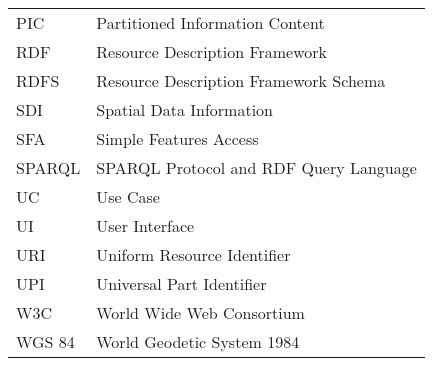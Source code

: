 \begin{longtable}{lp{11cm}}
  
  PIC & Partitioned Information Content   \\
  
  
  RDF &  Resource Description Framework\\
  RDFS & Resource Description Framework Schema\\
  SDI  & Spatial Data Information\\
  SFA & Simple Features Access \\
  SPARQL	 & SPARQL Protocol and RDF Query Language\\
  
  UC & Use Case \\
  UI  & User Interface \\
  URI &	Uniform Resource Identifier\\
  UPI & Universal Part Identifier\\
  
  W3C & World Wide Web Consortium \\
  WGS 84 & World Geodetic System 1984 \\
  







  
  
 
\end{longtable}
